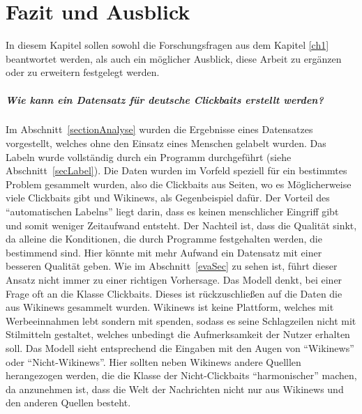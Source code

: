 \chapter{Fazit und Ausblick} \label{ch9}
In diesem Kapitel sollen sowohl die Forschungsfragen aus dem Kapitel \ref{ch1} beantwortet werden, als auch ein möglicher Ausblick, diese Arbeit zu ergänzen oder zu erweitern festgelegt werden.

 

\paragraph{Wie kann ein Datensatz für deutsche Clickbaits erstellt werden?}
Im Abschnitt~\ref{sectionAnalyse} wurden die Ergebnisse eines Datensatzes vorgestellt, welches ohne den Einsatz eines Menschen gelabelt wurden. Das Labeln wurde vollständig durch ein Programm durchgeführt (siehe Abschnitt~\ref{secLabel}). Die Daten wurden im Vorfeld speziell für ein bestimmtes Problem gesammelt wurden, also die Clickbaits aus Seiten, wo es Möglicherweise viele Clickbaits gibt  und Wikinews, als Gegenbeispiel dafür. Der Vorteil des \enquote{automatischen Labelns} liegt darin, dass es keinen menschlicher Eingriff gibt und somit weniger Zeitaufwand entsteht. Der Nachteil ist, dass die Qualität sinkt, da alleine die Konditionen, die durch Programme festgehalten werden, die bestimmend sind. Hier könnte mit mehr Aufwand ein Datensatz mit einer besseren Qualität geben. Wie im Abschnitt~\ref{evaSec} zu sehen ist, führt dieser Ansatz nicht immer zu einer richtigen Vorhersage. Das Modell denkt, bei einer Frage oft an die Klasse Clickbaits. Dieses ist rückzuschließen auf die Daten die aus Wikinews gesammelt wurden. Wikinews ist keine Plattform, welches mit Werbeeinnahmen lebt sondern mit spenden, sodass es seine Schlagzeilen nicht mit Stilmitteln gestaltet, welches unbedingt die Aufmerksamkeit der Nutzer erhalten soll. Das Modell sieht entsprechend die Eingaben mit den Augen von \enquote{Wikinews} oder \enquote{Nicht-Wikinews}. Hier sollten neben Wikinews andere Quelllen herangezogen werden, die die Klasse der Nicht-Clickbaits \enquote{harmonischer} machen, da anzunehmen ist, dass die Welt der Nachrichten nicht nur aus Wikinews und den anderen Quellen besteht.


